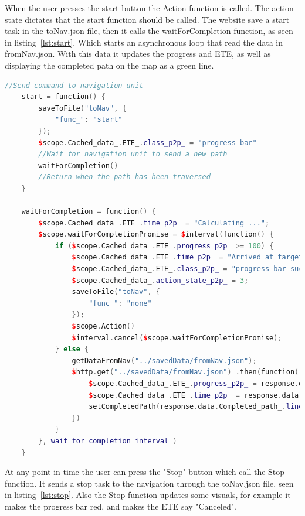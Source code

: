 When the user presses the start button the Action function is called. The action state dictates that the start function should be called.  The website save a start task in the toNav.json file, then it calls the waitForCompletion function, as seen in listing~\ref{lst:start}. Which starts an asynchronous loop that read the data in fromNav.json. With this data it updates the progress and ETE, as well as displaying the completed path on the map as a green line. 

\begin{lstlisting}[caption = {the start and waitForCompletion functions in p2p.js}, captionpos=b, label={lst:start}, language=C++,firstnumber=1]
    //Send command to navigation unit
    start = function() {
        saveToFile("toNav", {
            "func_": "start"
        });
        $scope.Cached_data_.ETE_.class_p2p_ = "progress-bar"
        //Wait for navigation unit to send a new path
        waitForCompletion()
        //Return when the path has been traversed
    }

    waitForCompletion = function() {
        $scope.Cached_data_.ETE_.time_p2p_ = "Calculating ...";
        $scope.waitForCompletionPromise = $interval(function() {
            if ($scope.Cached_data_.ETE_.progress_p2p_ >= 100) {
                $scope.Cached_data_.ETE_.time_p2p_ = "Arrived at target";
                $scope.Cached_data_.ETE_.class_p2p_ = "progress-bar-success"
                $scope.Cached_data_.action_state_p2p_ = 3;
                saveToFile("toNav", {
                    "func_": "none"
                });
                $scope.Action()
                $interval.cancel($scope.waitForCompletionPromise);
            } else {
                getDataFromNav("../savedData/fromNav.json");
                $http.get("../savedData/fromNav.json") .then(function(response) {
					$scope.Cached_data_.ETE_.progress_p2p_ = response.data.Progress_.percentage_;
                    $scope.Cached_data_.ETE_.time_p2p_ = response.data.Progress_.ete_;
                    setCompletedPath(response.data.Completed_path_.line_);
                })
            }
        }, wait_for_completion_interval_)
    }
\end{lstlisting}

At any point in time the user can press the "Stop" button which call the Stop function. It sends a stop task to the navigation through the toNav.json file, seen in listing~\ref{lst:stop}. Also the Stop function updates some visuals, for example it makes the progress bar red, and makes the ETE say "Canceled".

